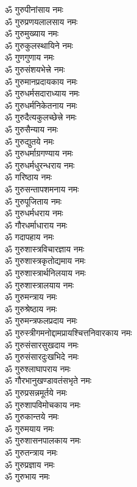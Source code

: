 \begin{multicols}{2}
\begin{flushleft}
ॐ गुरुपीनांसाय नमः\hfill{}\\
ॐ गुरुप्रणयलालसाय नमः\\
ॐ गुरुमुख्याय नमः\\
ॐ गुरुकुलस्थायिने नमः\\
ॐ गुणगुणाय नमः\\
ॐ गुरुसंशयभेत्त्रे नमः\\
ॐ गुरुमानप्रदायकाय नमः\\
ॐ गुरुधर्मसदाराध्याय नमः\\
ॐ गुरुधर्मनिकेतनाय नमः\\
ॐ गुरुदैत्यकुलच्छेत्त्रे नमः\\
ॐ गुरुसैन्याय नमः\hfill{}\\
ॐ गुरुद्युतये नमः\\
ॐ गुरुधर्माग्रगण्याय नमः\\
ॐ गुरुधर्मधुरन्धराय नमः\\
ॐ गरिष्ठाय नमः\\
ॐ गुरुसन्तापशमनाय नमः\\
ॐ गुरुपूजिताय नमः\\
ॐ गुरुधर्मधराय नमः\\
ॐ गौरधर्माधाराय नमः\\
ॐ गदापहाय नमः\\
ॐ गुरुशास्त्रविचारज्ञाय नमः\hfill{}\\
ॐ गुरुशास्त्रकृतोद्यमाय नमः\\
ॐ गुरुशास्त्रार्थनिलयाय नमः\\
ॐ गुरुशास्त्रालयाय नमः\\
ॐ गुरुमन्त्राय नमः\\
ॐ गुरुश्रेष्ठाय नमः\\
ॐ गुरुमन्त्रफलप्रदाय नमः\\
ॐ गुरुस्त्रीगमनोद्दाम\-प्रायश्चित्तनिवारकाय नमः\\
ॐ गुरुसंसारसुखदाय नमः\\
ॐ गुरुसंसारदुःखभिदे नमः\\
ॐ गुरुश्लाघापराय नमः\hfill{}\\
ॐ गौरभानुखण्डावतंसभृते नमः\\
ॐ गुरुप्रसन्नमूर्तये नमः\\
ॐ गुरुशापविमोचकाय नमः\\
ॐ गुरुकान्तये नमः\\
ॐ गुरुमयाय नमः\\
ॐ गुरुशासनपालकाय नमः\\
ॐ गुरुतन्त्राय नमः\\
ॐ गुरुप्रज्ञाय नमः\\
ॐ गुरुभाय नमः\\

\end{flushleft}
\end{multicols}
